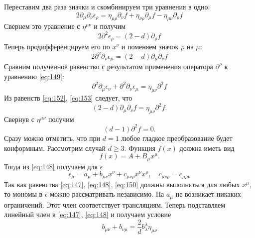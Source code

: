 \documentclass[a4paper,12pt]{article}
\theoremstyle{definition}
\theoremstyle{definition}
\theoremstyle{definition}
\begin{document}
Переставим два раза значки и скомбинируем три уравнения в одно:
\begin{equation}
  \label{eq:150}
  2\partial_{\mu}\partial_{\nu}\epsilon_{\rho}=\eta_{\mu\rho}\partial_{\nu} f+\eta_{\nu\rho}\partial_{\mu}f-\eta_{\mu\nu}\partial_{\rho}f
\end{equation}
Свернем это уравнение с $\eta^{\mu\nu}$ и получим
\begin{equation}
  \label{eq:151}
  2\partial^2 \epsilon_{\rho}=(2-d)\partial_{\rho}f
\end{equation}
Теперь продифференцируем его по $x^{\nu}$ и поменяем значок $\rho$ на $\mu$:
\begin{equation}
  \label{eq:152}
  2\partial^2 \partial_{\nu} \epsilon_{\mu}=(2-d)\partial_{\mu}\partial_{\nu} f
\end{equation}
Сравним полученное равенство с результатом применения оператора $\partial^{\rho}$ к уравнению \eqref{eq:149}:
\begin{equation}
  \label{eq:153}
  \partial^2 \partial_{\mu}\epsilon_{\nu}+\partial^2 \partial_{\nu}\epsilon_{\mu}=\eta_{\mu\nu}\partial^2 f
\end{equation}
Из равенств \eqref{eq:152}, \eqref{eq:153} следует, что
\begin{equation}
  \label{eq:154}
  (2-d)\partial_{\mu}\partial_{\nu}f=\eta_{\mu\nu}\partial^2 f.
\end{equation}
Свернув с $\eta^{\mu\nu}$ получим
\begin{equation}
  \label{eq:155}
  (d-1)\partial^2 f =0.
\end{equation}
Сразу можно отметить, что при $d=1$ любое гладкое преобразование будет конформным. Рассмотрим случай $d\geq 3$. Функция $f(x)$ должна иметь вид
\begin{equation}
  \label{eq:156}
  f(x)=A+B_{\mu}x^{\mu}.
\end{equation}
Тогда из \eqref{eq:148} получаем для $\epsilon$
\begin{equation}
  \label{eq:157}
  \epsilon_{\mu}=a_{\mu}+b_{\mu\nu}x^{\nu} +c_{\mu\nu\rho}x^{\nu}x^{\rho},\quad c_{\mu\nu\rho}=c_{\mu\rho\nu}
\end{equation}
Так как равенства \eqref{eq:147}, \eqref{eq:148}, \eqref{eq:150} должны выполняться для любых $x^{\mu}$, то мономы в $\epsilon$ можно рассматривать независимо. На $a_{\mu}$ не возникает никаких ограничений. Этот член соответствует трансляциям. Теперь подставляем линейный член в \eqref{eq:147}, \eqref{eq:148} и получаем условие
\begin{equation}
  \label{eq:158}
  b_{\mu\nu}+b_{\nu\mu}=\frac{2}{d}b^{\lambda}_{\lambda}\eta_{\mu\nu}
\end{equation}
\end{document}
